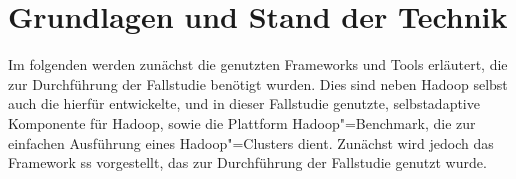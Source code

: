 \chapter{Grundlagen und Stand der Technik}
\label{ch:basics}

Im folgenden werden zunächst die genutzten Frameworks und Tools erläutert, die zur Durchführung der Fallstudie benötigt wurden.
Dies sind neben Hadoop selbst auch die hierfür entwickelte, und in dieser Fallstudie genutzte, selbstadaptive Komponente für Hadoop, sowie die Plattform Hadoop"=Benchmark, die zur einfachen Ausführung eines Hadoop"=Clusters dient.
Zunächst wird jedoch das Framework \acrshort{ss} vorgestellt, das zur Durchführung der Fallstudie genutzt wurde.

%








